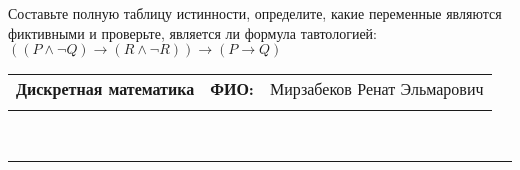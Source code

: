 \documentclass[10pt]{exam}
\newcommand{\class}{Дискретная математика}
\newcommand{\examdate}{}
\begin{document}
\begin{questions}
\begin{enumerate}[a)]
\end{enumerate}\question Составьте полную таблицу истинности, определите, какие переменные являются фиктивными и проверьте, является ли формула тавтологией:
$(( P \land \neg Q) \rightarrow (R \land \neg R)) \rightarrow (P \rightarrow Q)$

\end{questions}
\newpage
\begin{flushright}
\begin{tabular}{p{2.8in} r l}
\textbf{\class} & \textbf{ФИО:} &Мирзабеков Ренат Эльмарович
\\

\textbf{\examdate} &&\\
\end{tabular}\\
\end{flushright}
\rule[1ex]{\textwidth}{.1pt}
\end{document}
